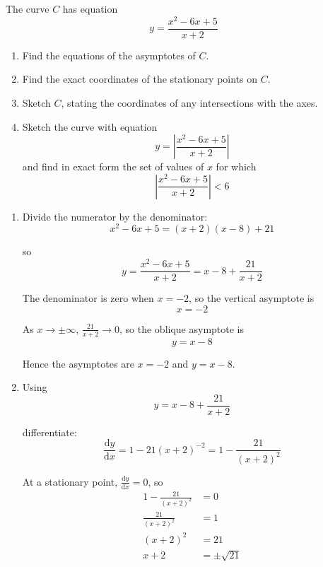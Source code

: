 \documentclass[leqno]{article}
\begin{document}
\begin{enumerate}[
  label=\textbf{\arabic*.},
  leftmargin=*,
  topsep=0pt,
  partopsep=0pt,
  parsep=0pt
]
\newpage

\questionitem

The curve $C$ has equation
\[
y=\frac{x^2-6x+5}{x+2}
\]
\begin{enumerate}[label=\textbf{(\alph*)}]
  \item Find the equations of the asymptotes of $C$.  \\
  \item Find the exact coordinates of the stationary points on $C$.  \\
  \item Sketch $C$, stating the coordinates of any intersections with the axes.  \\
  \item Sketch the curve with equation
  \[
  y=\left|\frac{x^2-6x+5}{x+2}\right|
  \]
  and find in exact form the set of values of $x$ for which
  \[
  \left|\frac{x^2-6x+5}{x+2}\right|<6
  \]
\end{enumerate}

\vspace*{10pt}

\begin{djsSolution}
\begin{enumerate}[label=\textbf{(\alph*)}]
  \item Divide the numerator by the denominator:
  \[
  x^2-6x+5=(x+2)(x-8)+21
  \]

  so
  \[
  y=\frac{x^2-6x+5}{x+2}=x-8+\frac{21}{x+2}
  \]

  The denominator is zero when \(x=-2\), so the vertical asymptote is
  \[
  x=-2
  \]

  As \(x\to\pm\infty\), \(\frac{21}{x+2}\to 0\), so the oblique asymptote is
  \[
  y=x-8
  \]

  Hence the asymptotes are \(x=-2\) and \(y=x-8\).

  \item Using
  \[
  y=x-8+\frac{21}{x+2}
  \]

  differentiate:
  \[
  \frac{\mathrm{d}y}{\mathrm{d}x}=1-21(x+2)^{-2}=1-\frac{21}{(x+2)^2}
  \]

  At a stationary point, \(\frac{\mathrm{d}y}{\mathrm{d}x}=0\), so
  \begin{align*}
  1-\frac{21}{(x+2)^2}&=0 \\
  \frac{21}{(x+2)^2}&=1 \\
  (x+2)^2&=21 \\
  x+2&=\pm\sqrt{21}
  \end{align*}


\end{enumerate}
\end{djsSolution}
\end{enumerate}
\end{document}
